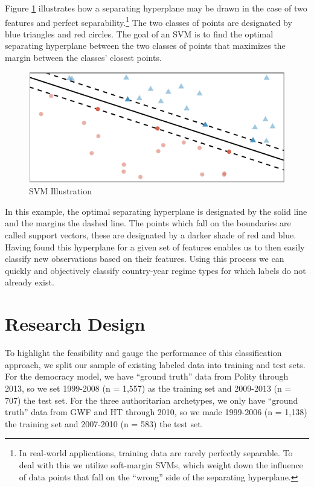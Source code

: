 \documentclass[pdftex,12pt,fullpage,oneside]{amsart}
\begin{document}
Figure \ref{fig:svmIntro} illustrates how a separating hyperplane may be drawn in the case of two features and perfect separability.\footnote{In real-world applications, training data are rarely perfectly separable. To deal with this we utilize soft-margin SVMs, which weight down the influence of data points that fall on the ``wrong'' side of the separating hyperplane.} The two classes of points are designated by blue triangles and red circles. The goal of an SVM is to find the optimal separating hyperplane between the two classes of points that maximizes the margin between the classes' closest points. 

\begin{figure}[ht]
	\centering
	\includegraphics[width=.7\textwidth]{svmIntro}
	\caption{SVM Illustration}
	\label{fig:svmIntro}
\end{figure}
\FloatBarrier

In this example, the optimal separating hyperplane is designated by the solid line and the margins the dashed line. The points which fall on the boundaries are called support vectors, these are designated by a darker shade of red and blue. Having found this hyperplane for a given set of features enables us to then easily classify new observations based on their features. Using this process we can quickly and objectively classify country-year regime types for which labels do not already exist.

\section{Research Design}

To highlight the feasibility and gauge the performance of this classification approach, we split our sample of existing labeled data into training and test sets. For the democracy model, we have ``ground truth'' data from Polity through 2013, so we set 1999-2008 (n = 1,557) as the training set and 2009-2013 (n = 707) the test set. For the three authoritarian archetypes, we only have ``ground truth'' data from GWF and HT through 2010, so we made 1999-2006 (n = 1,138) the training set and 2007-2010 (n = 583) the test set. 
\end{document}

